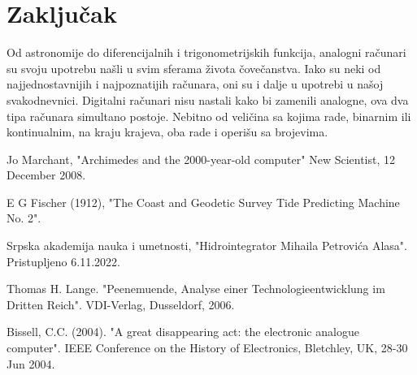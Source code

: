 \documentclass[a4paper]{article}
\begin{document}
		\pagebreak
		
\section{Zaključak}
Od astronomije do diferencijalnih i trigonometrijskih funkcija, analogni računari su svoju upotrebu našli u svim sferama života čovečanstva. Iako su neki od najjednostavnijih i najpoznatijih računara, oni su i dalje u upotrebi u našoj svakodnevnici. Digitalni računari nisu nastali kako bi zamenili analogne, ova dva tipa računara simultano postoje. Nebitno od veličina sa kojima rade, binarnim ili kontinualnim, na kraju krajeva, oba rade i operišu sa brojevima.

\appendix

\begin{thebibliography}{9}



 Jo Marchant, "Archimedes and the 2000-year-old computer" New Scientist, 12 December 2008.

 E G Fischer (1912), "The Coast and Geodetic Survey Tide Predicting Machine No. 2".

 Srpska akademija nauka i umetnosti, "Hidrointegrator Mihaila Petrovića Alasa". Pristupljeno 6.11.2022.

 Thomas H. Lange. "Peenemuende, Analyse einer Technologieentwicklung im Dritten Reich". VDI-Verlag, Dusseldorf, 2006.
			
 Bissell, C.C. (2004). "A great disappearing act: the electronic analogue computer". IEEE Conference on the History of Electronics, Bletchley, UK, 28-30 Jun 2004.


\end{thebibliography}
\end{document}
